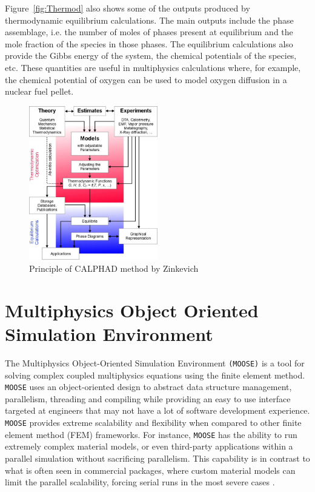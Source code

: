 Figure~\ref{fig:Thermod} also shows some of the outputs produced by thermodynamic equilibrium calculations. The main outputs include the phase assemblage, i.e. the number of moles of phases present at equilibrium and the mole fraction of the species in those phases. The equilibrium calculations also provide the Gibbs energy of the system, the chemical potentials of the species, etc. These quantities are useful in multiphysics calculations where, for example, the chemical potential of oxygen can be used to model oxygen diffusion in a  nuclear fuel pellet.
	\begin{figure}[htbp]
	\centering
	\includegraphics[width=0.5\textwidth]{figures/Calphad_method}
	\caption{Principle of CALPHAD method by Zinkevich \cite{Zinkevich:2003aa}}
	\label{fig:calphad}
	\end{figure}

\section{Multiphysics Object Oriented Simulation Environment}
	The  Multiphysics Object-Oriented Simulation Environment \texttt{(MOOSE)} is a tool for solving complex coupled multiphysics equations using the finite element method. \texttt{MOOSE} uses an object-oriented design to abstract data structure management, parallelism, threading and compiling while providing an easy to use interface targeted at engineers that may not have a lot of software development experience. \texttt{MOOSE} provides extreme scalability and flexibility when compared to other finite element method (FEM) frameworks. For instance, \texttt{MOOSE} has the ability to run extremely complex material models, or even third-party applications within a parallel simulation without sacrificing parallelism. This capability is in contrast to what is often seen in commercial packages, where custom material models can limit the parallel scalability, forcing serial runs in the most severe cases \cite{gaston2015physics,moose-web-page}.

